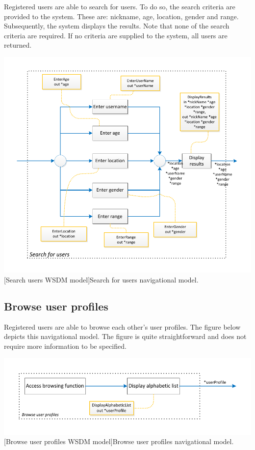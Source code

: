\documentclass[11pt, a4paper,svglistings,oneside]{book}
\begin{document}
Registered users are able to search for users. To do so, the search criteria are provided to the system. These are: nickname, age, location, gender and range. Subsequently, the system displays the results. Note that none of the search criteria are required. If no criteria are supplied to the system, all users are returned.
$\;$ \\
\noindent\begin{minipage}{\textwidth}
    \centering
   \includegraphics[scale=1]{nav_SearchUsers.pdf}
 [Search users WSDM model]{Search for users navigational model.}
\end{minipage}

\subsection{Browse user profiles}

Registered users are able to browse each other's user profiles. The figure below depicts this navigational model. The figure is quite straightforward and does not require more information to be specified.
$\;$ \\
\noindent\begin{minipage}{\textwidth}
    \centering
   \includegraphics[scale=1]{nav_BrowseUserProfile.pdf}
 [Browse user profiles WSDM model]{Browse user profiles navigational model.}
\end{minipage}
\end{document}

